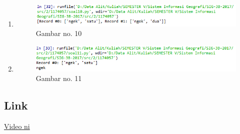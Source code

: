 \begin{enumerate}
    \item 
	
	\begin{figure}[H]
		\includegraphics[width=12cm]{figures/1174057/fajar10.PNG}
		\centering
		\caption{Gambar no. 10}
	\end{figure}

	\item 
	
	\begin{figure}[H]
		\includegraphics[width=12cm]{figures/1174057/fajar11.PNG}
		\centering
		\caption{Gambar no. 11}
	\end{figure}
\end{enumerate}

\subsection{Link}
\href{https://www.youtube.com/watch?v=PxCZFZzLivM}{Video ni}